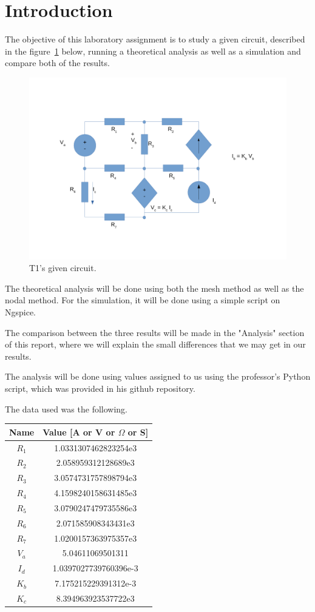 \section{Introduction}
\label{sec:introduction}

The objective of this laboratory assignment is to study a given circuit, described in the figure~\ref{fig:circuito} below, running a theoretical analysis as well as a simulation and compare both of the results.

\begin{figure}[H] \centering
\includegraphics[width=0.6\linewidth]{circuito.pdf}
\caption{T1's given circuit.}
\label{fig:circuito}
\end{figure}

The theoretical analysis will be done using both the mesh method as well as the nodal method. For the simulation, it will be done using a simple script on Ngspice. \par
The comparison between the three results will be made in the "Analysis" section of this report, where we will explain the small differences that we may get in our results. \par
The analysis will be done using values assigned to us using the professor's Python script, which was provided in his github repository. \par
The data used was the following.
\begin{center}
  \begin{tabular}{ | c | c | }
    \hline    
    {\bf Name} & {\bf Value [A or V or $\Omega$ or S]} \\ \hline
    $R_1$ & 1.0331307462823254e3 \\ \hline 
    $R_2$ & 2.058959312128689e3 \\ \hline 
    $R_3$ & 3.0574731757898794e3 \\ \hline 
    $R_4$ & 4.1598240158631485e3 \\ \hline 
    $R_5$ & 3.0790247479735586e3 \\ \hline 
    $R_6$ & 2.071585908343431e3 \\ \hline 
    $R_7$ & 1.0200157363975357e3 \\ \hline 
    $V_a$ & 5.04611069501311 \\ \hline 
    $I_d$ & 1.0397027739760396e-3 \\ \hline
    $K_b$ & 7.175215229391312e-3 \\ \hline
    $K_c$ & 8.394963923537722e3 \\ 
    \hline
  \end{tabular}
\end{center}



